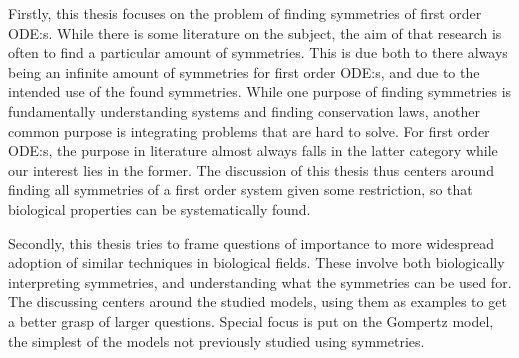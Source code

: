 Firstly, this thesis focuses on the problem of finding symmetries of first order ODE:s.
While there is some literature on the subject, the aim of that research is often to find a particular amount of symmetries.
This is due both to there always being an infinite amount of symmetries for first order ODE:s, and due to the intended use of the found symmetries.
While one purpose of finding symmetries is fundamentally understanding systems and finding conservation laws, another common purpose is integrating problems that are hard to solve.
For first order ODE:s, the purpose in literature almost always falls in the latter category while our interest lies in the former.
The discussion of this thesis thus centers around finding all symmetries of a first order system given some restriction, so that biological properties can be systematically found.

Secondly, this thesis tries to frame questions of importance to more widespread adoption of similar techniques in biological fields.
These involve both biologically interpreting symmetries, and understanding what the symmetries can be used for.
The discussing centers around the studied models, using them as examples to get a better grasp of larger questions.
Special focus is put on the Gompertz model, the simplest of the models not previously studied using symmetries.

